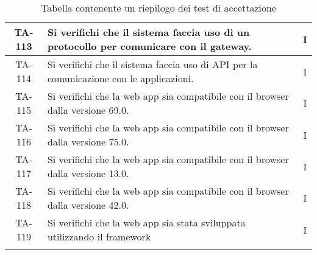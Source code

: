 \begin{center}
\begin{longtable}{|c|p{10cm}|c|}
			 \hline
			 TA-113 & Si verifichi che il sistema faccia uso di un protocollo per comunicare con il gateway. & I \\
			 \hline
			 TA-114 & Si verifichi che il sistema faccia uso di API per la comunicazione con le applicazioni. & I \\
			 \hline
			 TA-115 & Si verifichi che la web app sia compatibile con il browser \glock{Firefox} dalla versione 69.0. & I \\
			 \hline
			 TA-116 & Si verifichi che la web app sia compatibile con il browser \glock{Chrome} dalla versione 75.0. & I \\
			 \hline
			 TA-117 & Si verifichi che la web app sia compatibile con il browser \glock{Safari} dalla versione 13.0. & I \\
			 \hline
			 TA-118 & Si verifichi che la web app sia compatibile con il browser \glock{Edge} dalla versione 42.0. & I \\
			 \hline
			 TA-119 & Si verifichi che la web app sia stata sviluppata utilizzando il framework \glock{Bootstrap} & I \\
			 \hline

			 \caption{Tabella contenente un riepilogo dei test di accettazione}
			\end{longtable}
		\end{center}
		
